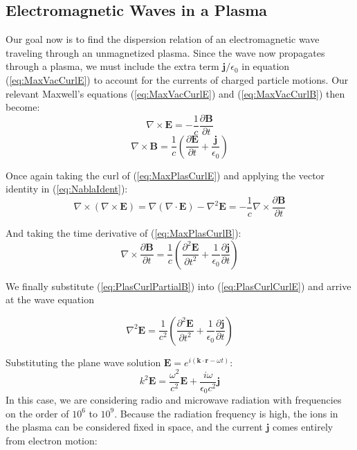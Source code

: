\documentclass[twocolumn]{article}
\begin{document}
\subsection*{Electromagnetic Waves in a Plasma}
Our goal now is to find the dispersion relation of an electromagnetic wave traveling through an unmagnetized plasma.
Since the wave now propagates through a plasma, we must include the extra term $\mathbf{j}/\epsilon_0$ in equation (\ref{eq:MaxVacCurlE}) to account for the currents of charged particle motions.
Our relevant Maxwell's equations (\ref{eq:MaxVacCurlE}) and (\ref{eq:MaxVacCurlB}) then become:
\begin{equation}
	\label{eq:MaxPlasCurlE}
	\nabla \times \mathbf{E} = -\frac{1}{c} \frac{\partial \mathbf{B}}{\partial t}
\end{equation}
\begin{equation}
	\label{eq:MaxPlasCurlB}
	\nabla \times \mathbf{B} = \frac{1}{c} (\frac{\partial \mathbf{E}}{\partial t} + \frac{\mathbf{j}}{\epsilon_0})
\end{equation}

Once again taking the curl of (\ref{eq:MaxPlasCurlE}) and applying the vector identity in (\ref{eq:NablaIdent}):
\begin{equation}
	\label{eq:PlasCurlCurlE}
	\nabla \times (\nabla \times \mathbf{E}) = \nabla(\nabla \cdot \mathbf{E}) - \nabla^2 \mathbf{E} = -\frac{1}{c}\nabla \times \frac{\partial \mathbf{B}}{\partial t}
\end{equation}

And taking the time derivative of (\ref{eq:MaxPlasCurlB}):
\begin{equation}
	\label{eq:PlasCurlPartialB}
	\nabla \times \frac{\partial \mathbf{B}}{\partial t} = \frac{1}{c}(\frac{\partial^2 \mathbf{E}}{\partial t^2} + \frac{1}{\epsilon_0} \frac{\partial \mathbf{j}}{\partial t})
\end{equation}

We finally substitute (\ref{eq:PlasCurlPartialB}) into (\ref{eq:PlasCurlCurlE}) and arrive at the wave equation

\begin{equation}
	\nabla^2 \mathbf{E} = \frac{1}{c^2}(\frac{\partial^2 \mathbf{E}}{\partial t^2} + \frac{1}{\epsilon_0} \frac{\partial \mathbf{j}}{\partial t})
\end{equation}

Substituting the plane wave solution $\mathbf{E} = e^{i(\mathbf{k} \cdot \mathbf{r} - \omega t)}$:
\begin{equation}
	\label{eq:PlasPlaneWave1}
	k^2\mathbf{E} = \frac{\omega^2}{c^2}\mathbf{E} + \frac{i\omega}{\epsilon_0 c^2}\mathbf{j}
\end{equation}
In this case, we are considering radio and microwave radiation with frequencies on the order of $10^6$ to $10^9$.
Because the radiation frequency is high, the ions in the plasma can be considered fixed in space, and the current $\mathbf{j}$ comes entirely from electron motion:
 
\end{document}
